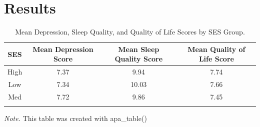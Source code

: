 \documentclass[man, noextraspace]{apa6}
\theoremstyle{definition}
\theoremstyle{definition}
\theoremstyle{definition}
\theoremstyle{remark}
\begin{document}
\section{Results}\label{results}

\begin{table}[tbp]
\begin{center}
\begin{threeparttable}
\caption{\label{tab:Table 1}Mean Depression, Sleep Quality, and Quality of Life Scores by SES Group.}
\begin{tabular}{cccc}
\toprule
SES & \multicolumn{1}{c}{Mean Depression Score} & \multicolumn{1}{c}{Mean Sleep Quality Score} & \multicolumn{1}{c}{Mean Quality of Life Score}\\
\midrule
High & 7.37 & 9.94 & 7.74\\
Low & 7.34 & 10.03 & 7.66\\
Med & 7.72 & 9.86 & 7.45\\
\bottomrule
\addlinespace
\end{tabular}
\begin{tablenotes}[para]
\normalsize{\textit{Note.} This table was created with apa\_table()}
\end{tablenotes}
\end{threeparttable}
\end{center}
\end{table}
\end{document}
